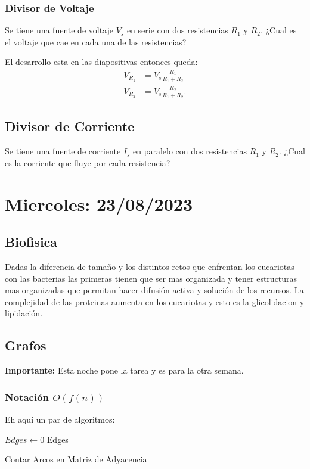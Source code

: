 \documentclass{report}
\begin{document}
\subsection{Divisor de Voltaje}
Se tiene una fuente de voltaje $V_s$ en serie con dos resistencias $R_1$ y $R_2$. ¿Cual es el voltaje que cae en cada una de las resistencias?

El desarrollo esta en las diapositivas entonces queda:
\begin{align*}
  V_{R_1}&= V_s \frac{R_1}{R_1+R_2}\\
  V_{R_2}&= V_s \frac{R_2}{R_1+R_2}
.\end{align*}
\section{Divisor de Corriente}
Se tiene una fuente de corriente $I_s$ en paralelo con dos resistencias $R_1$ y $R_2$. ¿Cual es la corriente que fluye por cada resistencia?

\chapter{Miercoles: 23/08/2023}
\section{Biofisica}

Dadas la diferencia de tamaño y los distintos retos que enfrentan los eucariotas con las bacterias las primeras tienen que ser mas organizada y tener estructuras mas organizadas que permitan hacer difusión activa y solución de los recursos. La complejidad de las proteinas aumenta en los eucariotas y esto es la glicolidacion y lipidación.

\section{Grafos}

\textbf{Importante:} Esta noche pone la tarea y es para la otra semana.

\subsection{Notación $O\left( f\left( n \right)  \right) $ }

Eh aqui un par de algoritmos:

  \begin{algorithm}
    $Edges\leftarrow 0$ \;
     {
       {
      }
    }
    \Return Edges
    \caption{Contar Arcos en Matriz de Adyacencia}
  \end{algorithm}
\end{document}
